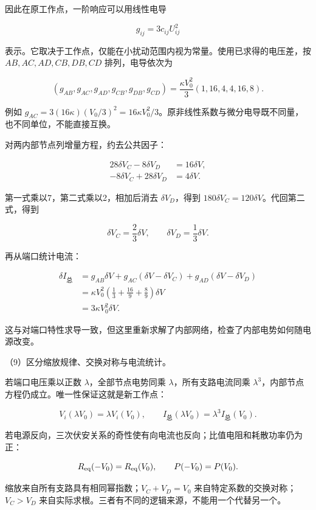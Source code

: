 \documentclass[12pt,a4paper,fontset=fandol]{ctexart}
\begin{document}
因此在原工作点，一阶响应可以用线性电导

\[
g_{ij}=3c_{ij}U_{ij}^2
\]

表示。它取决于工作点，仅能在小扰动范围内视为常量。使用已求得的电压差，按
\(AB,AC,AD,CB,DB,CD\) 排列，电导依次为

\[
(g_{AB},g_{AC},g_{AD},g_{CB},g_{DB},g_{CD})
=\frac{\kappa V_0^2}{3}(1,16,4,4,16,8).
\]

例如
\(g_{AC}=3(16\kappa)(V_0/3)^2=16\kappa V_0^2/3\)。原非线性系数与微分电导既不同量，也不同单位，不能直接互换。

对两内部节点列增量方程，约去公共因子：

\[
\begin{aligned}
28\delta V_C-8\delta V_D&=16\delta V,\\
-8\delta V_C+28\delta V_D&=4\delta V.
\end{aligned}
\]

第一式乘以7，第二式乘以2，相加后消去 \(\delta V_D\)，得到
\(180\delta V_C=120\delta V\)。代回第二式，得到

\[
\delta V_C=\frac23\delta V,\qquad
\delta V_D=\frac13\delta V.
\]

再从端口统计电流：

\[
\begin{aligned}
\delta I_{\text{总}}
&=g_{AB}\delta V+g_{AC}(\delta V-\delta V_C)
+g_{AD}(\delta V-\delta V_D)\\
&=\kappa V_0^2\left(\frac13+\frac{16}{9}+\frac89\right)\delta V\\
&=3\kappa V_0^2\delta V.
\end{aligned}
\]

这与对端口特性求导一致，但这里重新求解了内部网络，检查了内部电势如何随电源改变。

（9）区分缩放规律、交换对称与电流统计。

若端口电压乘以正数 \(\lambda\)，全部节点电势同乘
\(\lambda\)，所有支路电流同乘
\(\lambda^3\)，内部节点方程仍成立。唯一性保证这就是新工作点：

\[
V_i(\lambda V_0)=\lambda V_i(V_0),\qquad
I_{\text{总}}(\lambda V_0)=\lambda^3I_{\text{总}}(V_0).
\]

若电源反向，三次伏安关系的奇性使有向电流也反向；比值电阻和耗散功率仍为正：

\[
R_{\rm eq}(-V_0)=R_{\rm eq}(V_0),\qquad
P(-V_0)=P(V_0).
\]

缩放来自所有支路具有相同幂指数；\(V_C+V_D=V_0\)
来自特定系数的交换对称；\(V_C>V_D\)
来自实际求根。三者有不同的逻辑来源，不能用一个代替另一个。
\end{document}
